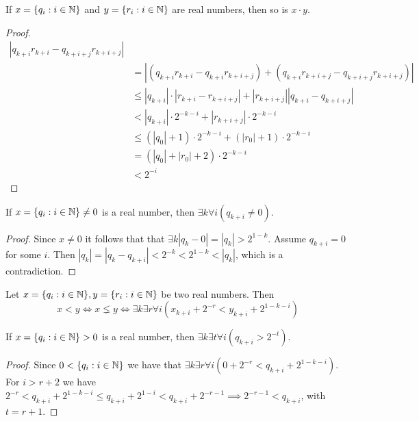 \documentclass[../main.tex]{memoir}
\begin{document}
\begin{theorem}
    If $x = \{q_i: i \in \mathbb{N}\}$ and $y = \{r_i: i \in \mathbb{N}\}$ are real numbers, then so is $x \cdot y$.
\end{theorem}
\begin{proof}
  \begin{align*}
    |q_{k + i}r_{k + i} - q_{k + i + j}r_{k + i + j}| \\
    & = |(q_{k + i}r_{k + i} - q_{k + i}r_{k + i + j}) + (q_{k + i}r_{k + i + j} - q_{k + i + j}r_{k + i + j})| \\
    & \le |q_{k + i}| \cdot |r_{k + i} - r_{k + i + j}| + |r_{k + i + j}||q_{k + i} - q_{k + i + j}| \\
    & < |q_{k + i}| \cdot 2^{-k-i} + |r_{k + i + j}| \cdot 2^{-k-i} \\
    & \le (|q_0| + 1) \cdot 2^{-k-i} + (|r_0| + 1) \cdot 2^{-k-i} \\
    & = (|q_0| + |r_0| + 2) \cdot 2^{-k-i} \\
    & < 2^{-i}
  \end{align*}
\end{proof}

\begin{lemma}
  If $x = \{q_i: i \in \mathbb{N}\} \neq 0$ is a real number, then $\exists k \forall i (q_{k + i} \neq 0)$.
\end{lemma}
\begin{proof}
  Since $x \neq 0$ it follows that that $\exists k |q_k - 0| = |q_k| > 2^{1 - k}$. Assume $q_{k + i} = 0$ for some $i$. Then $|q_k| = |q_k - q_{k + i}| < 2^{-k} < 2^{1 - k} < |q_k|$, which is a contradiction.
\end{proof}

\begin{definition}
  Let $x = \{q_i: i \in \mathbb{N}\}, y = \{r_i: i \in \mathbb{N}\}$ be two real numbers. Then
  \[
     x < y \iff x \lneq y \iff \exists k \exists r \forall i (x_{k + i} + 2^{-r} < y_{k + i} + 2^{1 - k - i})
  \]
\end{definition}

\begin{lemma}
  \label{lemma:separation}
  If $x = \{q_i: i \in \mathbb{N}\} > 0$ is a real number, then $\exists k \exists t \forall i (q_{k + i} > 2^{-t})$.
\end{lemma}
\begin{proof}
  Since $0 < \{q_i: i \in \mathbb{N}\}$ we have that $\exists k \exists r \forall i (0 + 2^{-r} < q_{k + i} + 2^{1 - k - i})$. For $i > r + 2$ we have $2^{-r} < q_{k + i} + 2^{1 - k - i} \le q_{k + i} + 2^{1 - i} < q_{k + i} + 2^{- r - 1} \implies 2^{- r - 1} < q_{k + i}$, with $t = r + 1$.
\end{proof}
\end{document}
